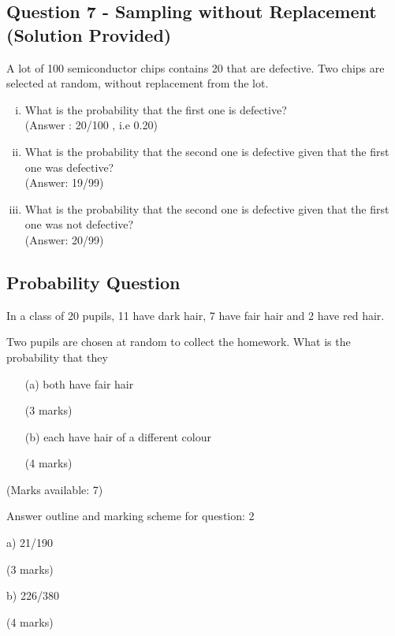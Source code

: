 	\subsection*{Question 7 - Sampling without Replacement (Solution Provided)}
	A lot of 100 semiconductor chips contains 20 that are defective.
	Two chips are selected at random, without replacement from the lot.
	\begin{enumerate}[(i)]
		\item What is the probability that the first one is defective? \\(Answer : 20/100 , i.e 0.20)
		\item What is the probability that the second one is defective given that the first one was defective? \\(Answer: 19/99)
		\item What is the probability that the second one is defective given that the first one was not defective? \\(Answer: 20/99)
	\end{enumerate}
	
	

\subsection{Probability Question}
In a class of 20 pupils, 11 have dark hair, 7 have fair hair and 2 have red hair.

Two pupils are chosen at random to collect the homework. What is the probability that they

\begin{itemize}
	\item[(a)] both have fair hair
	
	(3 marks)
	
	\item [(b)] each have hair of a different colour
	
	(4 marks)
\end{itemize}


(Marks available: 7)

Answer outline and marking scheme for question: 2

a) 21/190

(3 marks)

b) 226/380

(4 marks)

\newpage

